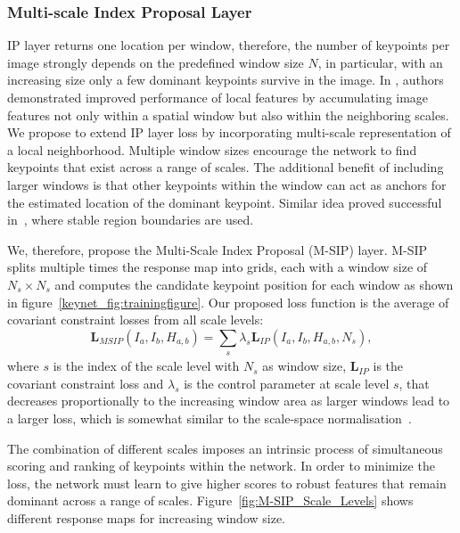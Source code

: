 \subsubsection{Multi-scale Index Proposal Layer}
\label{keynet_sec:multi_index_proposal_layer}

IP layer returns one location per window, therefore, the number of keypoints per image strongly depends on the predefined window size $N$, in particular, with an increasing size only a few dominant keypoints survive in the image. In \cite{DSPSIFT_soatto}, authors demonstrated improved performance of local features by accumulating image features not only within a spatial window but also within the neighboring scales. We propose to extend IP layer loss by incorporating multi-scale representation of a local neighborhood. Multiple window sizes encourage the network to find keypoints that exist across a range of scales. The additional benefit of including larger windows is that other keypoints within the window can act as anchors for the estimated location of the dominant keypoint. Similar idea proved successful in~\cite{Local_affine_frames_Matas}, where stable region boundaries are used.

We, therefore, propose the Multi-Scale Index Proposal (M-SIP) layer. M-SIP splits multiple times the response map into grids, each with a window size of $N_s \times N_s$ and computes the candidate keypoint position for each window as shown in figure~\ref{keynet_fig:trainingfigure}. Our proposed loss function is the average of covariant constraint losses from all scale levels: 
\begin{equation}
\mathbf{L}_{MSIP}(I_{a}, I_{b}, H_{a,b}) =  \sum_{\substack{s}}\lambda_{s} \mathbf{L}_{IP}(I_{a}, I_{b}, H_{a,b},N_s),
  \label{eq:context_losses_m}
\end{equation}
where $s$ is the index of the scale level with $N_s$ as window size, $\mathbf{L}_{IP}$ is the covariant constraint loss and $\lambda_{s}$ is the control parameter at scale level $s$, that decreases proportionally to the increasing window area as larger windows lead to a larger loss, which is somewhat similar to the scale-space normalisation~\cite{mikolajczykIJCV2004}. \par 

The combination of different scales imposes an intrinsic process of simultaneous scoring and ranking of keypoints within the network. In order to minimize the loss, the network must learn to give higher scores to robust features that remain dominant across a range of scales. Figure~\ref{fig:M-SIP_Scale_Levels} shows different response maps for increasing window size.


